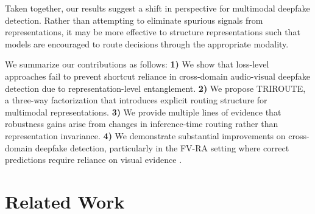 \documentclass{article}
\begin{document}
Taken together, our results suggest a shift in perspective for multimodal deepfake detection. Rather than attempting to eliminate spurious signals from representations, it may be more effective to structure representations such that models are encouraged to route decisions through the appropriate modality.

We summarize our contributions as follows:
\textbf{1)} We show that loss-level approaches fail to prevent shortcut reliance in cross-domain audio-visual deepfake detection due to representation-level entanglement.
\textbf{2)} We propose TRIROUTE, a three-way factorization that introduces explicit routing structure for multimodal representations.
\textbf{3)} We provide multiple lines of evidence that robustness gains arise from changes in inference-time routing rather than representation invariance.
\textbf{4)} We demonstrate substantial improvements on cross-domain deepfake detection, particularly in the FV-RA setting where correct predictions require reliance on visual evidence \citep{khalid2021fakeavceleb, cai2024avdeepfake1m}.

    
    
    


\section{Related Work}
\end{document}
